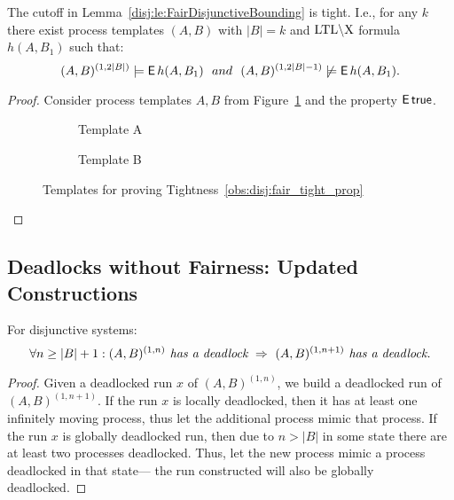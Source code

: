 \begin{tightness} \label{obs:disj:fair_tight_prop}
The cutoff in Lemma~\ref{disj:le:FairDisjunctiveBounding} is tight.
I.e., 
for any $k$ there exist process templates $(A,B)$ with $|B| = k$ 
and $\text{LTL}\backslash\text{X}$ formula $h(A,B_1)$ such that:
$$
(A,B)^{(1,2|B|)} \models \operatorname{\mathsf{E}} h(A,B_1) ~~and~~ 
(A,B)^{(1,2|B|-1)} \not\models \operatorname{\mathsf{E}} h(A,B_1).
$$
\end{tightness}
\begin{proof}
Consider process templates $A,B$ from Figure~\ref{fig:obs:disj:fair_tight_prop}
and the property $\operatorname{\mathsf{E}} \textsf{true}$.
% 
\begin{figure}[tb]
\centering
\begin{subfigure}[b]{0.35\textwidth}\center
\scalebox{0.75}{}
\caption*{Template A}
\end{subfigure}
\hspace{1cm}
\begin{subfigure}[b]{0.55\textwidth}\center
\scalebox{0.75}{}
\caption*{Template B}
\end{subfigure}
\caption{Templates for proving Tightness~\ref{obs:disj:fair_tight_prop}}
\label{fig:obs:disj:fair_tight_prop}
\end{figure}
%
\end{proof}


\subsection{Deadlocks without Fairness: Updated Constructions} \label{gua:sec:proofs-disj-deadlock-unfair}


\begin{lemma}
\label{mono_lem_disj_deadlocks_unfair}
    For disjunctive systems:
    $$\forall n\geq |B|+1: (A,B)^{(1,n)} \textit{ has a deadlock} \ 
    \Impl\ 
    (A,B)^{(1,n+1)} \textit{ has a deadlock.}$$
\end{lemma}
\begin{proof}
Given a deadlocked run $x$ of $(A,B)^{(1,n)}$,
we build a deadlocked run of $(A,B)^{(1,n+1)}$. 
If the run $x$ is locally deadlocked,
then it has at least one infinitely moving process, 
thus let the additional process mimic that process. 
If the run $x$ is globally deadlocked run, 
then due to $n>|B|$ in some state there are at least two processes deadlocked. 
Thus, let the new process mimic a process deadlocked in that state---%
the run constructed will also be globally deadlocked.
\end{proof}


